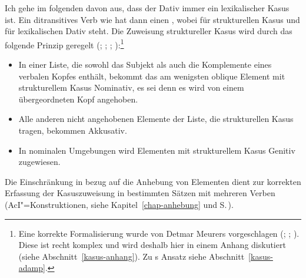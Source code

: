 Ich gehe im folgenden davon aus, dass der Dativ immer ein lexikalischer Kasus ist. 
Ein ditransitives Verb wie  hat dann einen \subcatw {},
wobei  für strukturellen Kasus und  für lexikalischen Dativ steht.
Die Zuweisung struktureller Kasus wird durch das folgende Prinzip geregelt (\citealp{Prze99}; 
\citealp{Meurers99b}; \citealp[Kapitel~10.4.1.4]{Meurers2000b}; \citealp{MdK2001a}):\footnote{
  Eine korrekte Formalisierung wurde von Detmar Meurers
  vorgeschlagen (\citealp{Meurers99b}; \citealp{MdK2001a}; \citealp[Kapitel~10.4.1.4]{Meurers2000b}).
  Diese ist recht komplex und wird deshalb hier in einem Anhang diskutiert (siehe Abschnitt~\ref{kasus-anhang}).
  Zu \prz{}s Ansatz siehe Abschnitt~\ref{kasus-adamp}.%
}
\begin{prinzip-break}[Kasusprinzip]
\label{case-p}
\begin{itemize}
\item In einer Liste, die sowohl das Subjekt als auch die Komplemente eines verbalen Kopfes
      enthält, bekommt das am wenigsten oblique Element mit strukturellem Kasus 
      Nominativ, es sei denn es wird von einem übergeordneten Kopf angehoben.
\item Alle anderen nicht angehobenen Elemente der Liste, die strukturellen Kasus tragen, bekommen Akkusativ.
\item In nominalen Umgebungen wird Elementen mit strukturellem Kasus Genitiv zugewiesen.
\end{itemize}
\end{prinzip-break}
Die Einschränkung in bezug auf die Anhebung von Elementen dient zur korrekten Erfassung der
Kasuszuweisung in bestimmten Sätzen mit mehreren Verben (\zb AcI"=Konstruktionen, siehe
Kapitel~\ref{chap-anhebung} und S.\,\pageref{page-aci-kasus}).

